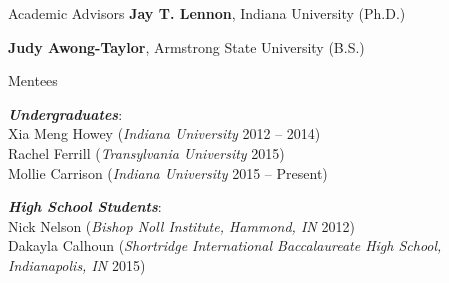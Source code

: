 \documentclass{resume} %
\begin{document}

\begin{rSection}{Academic Advisors}
  {\bf Jay T. Lennon}, Indiana University (Ph.D.)

  {\bf Judy Awong-Taylor}, Armstrong State University (B.S.)

\end{rSection}


\begin{rSection}{Mentees}

  {\bf \em Undergraduates}: \\
    Xia Meng Howey ({\em Indiana University} 2012 -- 2014) \\
    Rachel Ferrill ({\em Transylvania University} 2015) \\
    Mollie Carrison ({\em Indiana University} 2015 -- Present)

  {\bf \em High School Students}: \\
    Nick Nelson ({\em Bishop Noll Institute, Hammond, IN} 2012) \\
    Dakayla Calhoun ({\em Shortridge International Baccalaureate High
    School, Indianapolis, IN} 2015)

\end{rSection}
\end{document}

